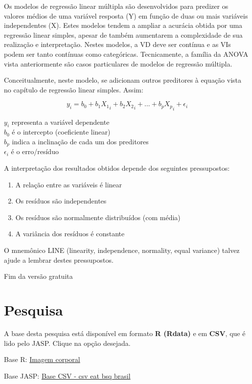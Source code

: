 \documentclass[
]{book}
\providecommand{\tightlist}{%
  \setlength{\itemsep}{0pt}\setlength{\parskip}{0pt}}
\newenvironment{base}{
  \definecolor{shadecolor}{rgb}{0.764,0.992,0.686}  %
  \color{black}
  \begin{shaded}}
 {\end{shaded}}
\begin{document}
Os modelos de regressão linear múltipla são desenvolvidos para predizer os valores médios de uma variável resposta (Y) em função de duas ou mais variáveis independentes (X). Estes modelos tendem a ampliar a acurácia obtida por uma regressão linear simples, apesar de também aumentarem a complexidade de sua realização e interpretação. Nestes modelos, a VD deve ser contínua e as VIs podem ser tanto contínuas como categóricas. Tecnicamente, a família da ANOVA vista anteriormente são casos particulares de modelos de regressão múltipla.

Conceitualmente, neste modelo, se adicionam outros preditores à equação vista no capítulo de regressão linear simples. Assim:

\[y_i = b_0 + b_1X{_1}_i + b_2X{_2}_i + ... + b_pX{_p}_i+ \epsilon_{i}\]

\(y_i\) representa a variável dependente\\
\(b_0\) é o intercepto (coeficiente linear)\\
\(b_p\) indica a inclinação de cada um dos preditores\\
\(\epsilon_{i}\) é o erro/resíduo

A interpretação dos resultados obtidos depende dos seguintes pressupostos:

\begin{enumerate}
\def\labelenumi{(\roman{enumi})}
\tightlist
\item
  A relação entre as variáveis é linear
\item
  Os resíduos são independentes\\
\item
  Os resíduos são normalmente distribuídos (com média)\\
\item
  A variância dos resíduos é constante
\end{enumerate}

O mnemônico LINE (linearity, independence, normality, equal variance) talvez ajude a lembrar destes pressupostos.

Fim da versão gratuita

\hypertarget{pesquisa-10}{%
\section{Pesquisa}\label{pesquisa-10}}

\begin{base}
A base desta pesquisa está disponível em formato \textbf{R (Rdata)} e em \textbf{CSV}, que é lido pelo JASP. Clique na opção desejada.

Base R: \href{https://github.com/anovabr/mqt/raw/master/bases/Base\%20R\%20-\%20imagem\%20corporal.RData}{Imagem corporal}

Base JASP: \href{https://github.com/anovabr/mqt/raw/master/bases/bases_csv_jasp.zip}{Base CSV - csv eat bsq brasil}

\end{base}
\end{document}
